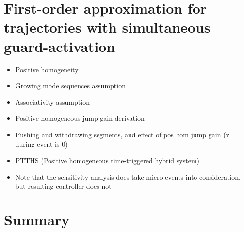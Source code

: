 \documentclass[../DC2017114Bouma.tex]{subfiles}
\begin{document}
\section{First-order approximation for trajectories with simultaneous guard-activation}
\begin{itemize}
\item Positive homogeneity
\item Growing mode sequences assumption
\item Associativity assumption
\item Positive homogeneous jump gain derivation
\item Pushing and withdrawing segments, and effect of pos hom jump gain (v during event is 0)
\item PTTHS (Positive homogeneous time-triggered hybrid system)
\item Note that the sensitivity analysis does take micro-events into consideration, but resulting controller does not
\end{itemize}
%
%
%
%
%
%

\section{Summary}
\end{document}
